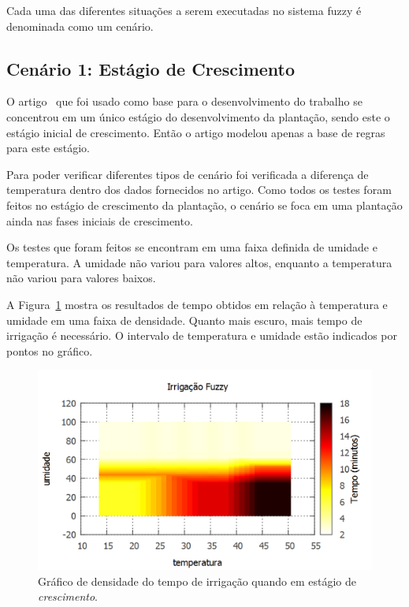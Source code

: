 \documentclass[
	article,			%
	11pt,				%
	oneside,			%
	a4paper,			%
	english,			%
	brazil,				%
	sumario=tradicional
	]{abntex2}
\begin{document}
\begin{multicols}{2}
Cada uma das diferentes situações a serem executadas no sistema fuzzy é denominada como um cenário.


\subsection{Cenário 1: Estágio de Crescimento}
O artigo~\cite{ceballos2015fuzzy} que foi usado como base para o desenvolvimento do trabalho se concentrou em um único estágio do desenvolvimento da plantação, sendo este o estágio inicial de crescimento. Então o artigo modelou apenas a base de regras para este estágio.

Para poder verificar diferentes tipos de cenário foi verificada a diferença de temperatura dentro dos dados fornecidos no artigo. Como todos os testes foram feitos no estágio de crescimento da plantação, o cenário se foca em uma plantação ainda nas fases iniciais de crescimento.

Os testes que foram feitos se encontram em uma faixa definida de umidade e temperatura. A umidade não variou para valores altos, enquanto a temperatura não variou para valores baixos.

A Figura~\ref{fig:densidadecrescimento} mostra os resultados de tempo obtidos em relação à temperatura e umidade em uma faixa de densidade. Quanto mais escuro, mais tempo de irrigação é necessário. O intervalo de temperatura e umidade estão indicados por pontos no gráfico.

\begin{figure}[H]
  \centering
  \includegraphics[width=1\linewidth]{densidade_crescimento}
  \caption{Gráfico de densidade do tempo de irrigação quando em estágio de \textit{crescimento}.}
  \label{fig:densidadecrescimento}
\end{figure}


\end{multicols}
\end{document}
